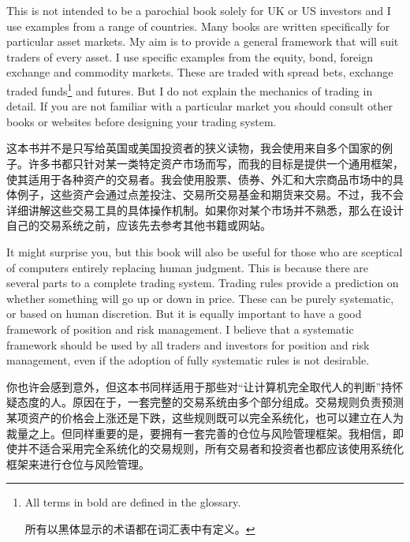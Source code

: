 \bipairgap

\begin{englishblock} This is not intended to be a parochial book solely for UK or US investors and I use examples from a range of countries. Many books are written specifically for particular asset markets. My aim is to provide a general framework that will suit traders of every asset. I use specific examples from the equity, bond, foreign exchange and commodity markets. These are traded with spread bets, exchange traded funds\footnote{All terms in bold are defined in the glossary. \par 所有以黑体显示的术语都在词汇表中有定义。} and futures. But I do not explain the mechanics of trading in detail. If you are not familiar with a particular market you should consult other books or websites before designing your trading system. \end{englishblock}

\begin{chineseblock}这本书并不是只写给英国或美国投资者的狭义读物，我会使用来自多个国家的例子。许多书都只针对某一类特定资产市场而写，而我的目标是提供一个通用框架，使其适用于各种资产的交易者。我会使用股票、债券、外汇和大宗商品市场中的具体例子，这些资产会通过点差投注、交易所交易基金和期货来交易。不过，我不会详细讲解这些交易工具的具体操作机制。如果你对某个市场并不熟悉，那么在设计自己的交易系统之前，应该先去参考其他书籍或网站。\end{chineseblock}

\bipairgap

\begin{englishblock} It might surprise you, but this book will also be useful for those who are sceptical of computers entirely replacing human judgment. This is because there are several parts to a complete trading system. Trading rules provide a prediction on whether something will go up or down in price. These can be purely systematic, or based on human discretion. But it is equally important to have a good framework of position and risk management. I believe that a systematic framework should be used by all traders and investors for position and risk management, even if the adoption of fully systematic rules is not desirable. \end{englishblock}

\begin{chineseblock}你也许会感到意外，但这本书同样适用于那些对“让计算机完全取代人的判断”持怀疑态度的人。原因在于，一套完整的交易系统由多个部分组成。交易规则负责预测某项资产的价格会上涨还是下跌，这些规则既可以完全系统化，也可以建立在人为裁量之上。但同样重要的是，要拥有一套完善的仓位与风险管理框架。我相信，即使并不适合采用完全系统化的交易规则，所有交易者和投资者也都应该使用系统化框架来进行仓位与风险管理。\end{chineseblock}

